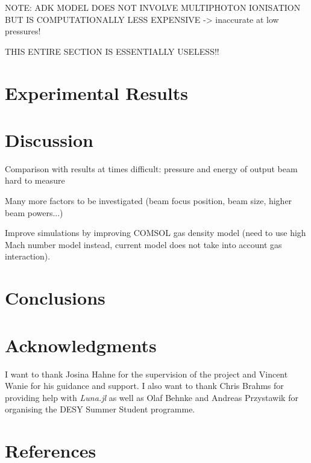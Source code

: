 \documentclass[a4paper]{jpconf}
\begin{document}
NOTE: ADK MODEL DOES NOT INVOLVE MULTIPHOTON IONISATION BUT IS COMPUTATIONALLY LESS EXPENSIVE
-> inaccurate at low pressures! 

THIS ENTIRE SECTION IS ESSENTIALLY USELESS!!

\section{Experimental Results}

\section{Discussion}
Comparison with results at times difficult: pressure and energy of output beam hard to measure


Many more factors to be investigated (beam focus position, beam size, higher beam powers...)


Improve simulations by improving COMSOL gas density model (need to use high Mach number model instead, current model does not take into account gas interaction). 

\section{Conclusions}

\section*{Acknowledgments}
I want to thank Josina Hahne for the supervision of the project and Vincent Wanie for his guidance and support. I also want to thank Chris Brahms for providing help with \textit{Luna.jl} as well as Olaf Behnke and Andreas Przystawik for organising the DESY Summer Student programme.  


\section*{References}


\end{document}
